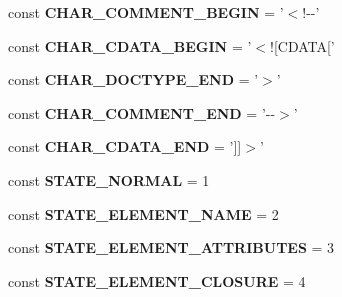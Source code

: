 \begin{DoxyCompactItemize}
\item 
\hypertarget{class_html_template_view_a30c3773dc9f5490ec65807b68470660e}{const {\bfseries C\-H\-A\-R\-\_\-\-C\-O\-M\-M\-E\-N\-T\-\_\-\-B\-E\-G\-I\-N} = '$<$!-\/-\/'}\label{class_html_template_view_a30c3773dc9f5490ec65807b68470660e}

\item 
\hypertarget{class_html_template_view_ac4b74e2c53ff5179a6342590b93746ab}{const {\bfseries C\-H\-A\-R\-\_\-\-C\-D\-A\-T\-A\-\_\-\-B\-E\-G\-I\-N} = '$<$!\mbox{[}C\-D\-A\-T\-A\mbox{[}'}\label{class_html_template_view_ac4b74e2c53ff5179a6342590b93746ab}

\item 
\hypertarget{class_html_template_view_a70d6e17e0ceaf5a300768e797274ca4e}{const {\bfseries C\-H\-A\-R\-\_\-\-D\-O\-C\-T\-Y\-P\-E\-\_\-\-E\-N\-D} = '$>$'}\label{class_html_template_view_a70d6e17e0ceaf5a300768e797274ca4e}

\item 
\hypertarget{class_html_template_view_a4ae9f4e478077a8a3a7fc366f381180e}{const {\bfseries C\-H\-A\-R\-\_\-\-C\-O\-M\-M\-E\-N\-T\-\_\-\-E\-N\-D} = '-\/-\/$>$'}\label{class_html_template_view_a4ae9f4e478077a8a3a7fc366f381180e}

\item 
\hypertarget{class_html_template_view_a6b9a682c4bffa946f5b3f531e8cff840}{const {\bfseries C\-H\-A\-R\-\_\-\-C\-D\-A\-T\-A\-\_\-\-E\-N\-D} = '\mbox{]}\mbox{]}$>$'}\label{class_html_template_view_a6b9a682c4bffa946f5b3f531e8cff840}

\item 
\hypertarget{class_html_template_view_a644a3009d23d51ab9cc77f4fe7da1eba}{const {\bfseries S\-T\-A\-T\-E\-\_\-\-N\-O\-R\-M\-A\-L} = 1}\label{class_html_template_view_a644a3009d23d51ab9cc77f4fe7da1eba}

\item 
\hypertarget{class_html_template_view_acd3e0f27b2c4d09f5b524ba516e9a593}{const {\bfseries S\-T\-A\-T\-E\-\_\-\-E\-L\-E\-M\-E\-N\-T\-\_\-\-N\-A\-M\-E} = 2}\label{class_html_template_view_acd3e0f27b2c4d09f5b524ba516e9a593}

\item 
\hypertarget{class_html_template_view_a54d57c586bf37f3a4fde8ea0b5248247}{const {\bfseries S\-T\-A\-T\-E\-\_\-\-E\-L\-E\-M\-E\-N\-T\-\_\-\-A\-T\-T\-R\-I\-B\-U\-T\-E\-S} = 3}\label{class_html_template_view_a54d57c586bf37f3a4fde8ea0b5248247}

\item 
\hypertarget{class_html_template_view_a46e4921c1c9b2dfea957d6e6a0618d05}{const {\bfseries S\-T\-A\-T\-E\-\_\-\-E\-L\-E\-M\-E\-N\-T\-\_\-\-C\-L\-O\-S\-U\-R\-E} = 4}\label{class_html_template_view_a46e4921c1c9b2dfea957d6e6a0618d05}


\end{DoxyCompactItemize}
